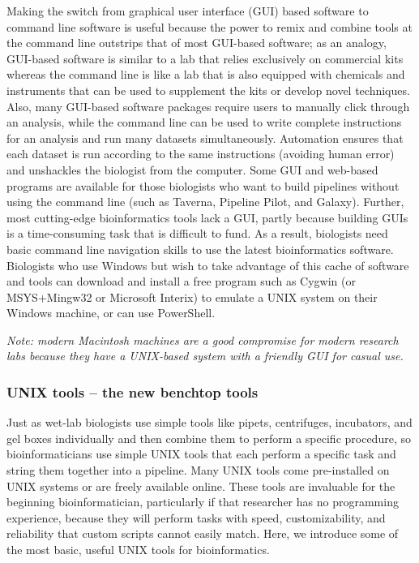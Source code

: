 \documentclass[ChapterTOCs,krantz2]{krantz} %
\newcommand{\unix}{UNIX}
\begin{document}
Making the switch from graphical user interface (GUI) based software 
to command line software is useful because
the power to remix and combine tools at the command line outstrips that
of most GUI-based software; as an analogy, GUI-based software is similar to a lab
that relies exclusively on commercial kits whereas the command line 
is like a lab that is also equipped with chemicals and instruments that can be used 
to supplement the kits or develop novel techniques.  Also, many
GUI-based software packages require users to manually click through an analysis,
while the command line can be used to write complete instructions for an
analysis and run many datasets simultaneously.   Automation ensures 
that each dataset is run according to the
same instructions (avoiding human error) and unshackles the biologist from
the computer.  
Some GUI and web-based programs are available 
for those biologists who want to build pipelines without using 
the command line (such as Taverna, Pipeline Pilot, and Galaxy).  
Further, most
cutting-edge bioinformatics tools lack a GUI,
partly because building GUIs is a time-consuming task that is
difficult to fund.  As a result, biologists need
basic command line navigation skills to use the latest bioinformatics software.  Biologists
who use Windows but wish to take advantage of this cache of software and tools
can download and install a free program such as Cygwin (or MSYS+Mingw32 or 
Microsoft Interix) to emulate a \unix{} system
on their Windows machine, or can use PowerShell.

\textsl{Note: modern Macintosh machines are a
good compromise for modern research labs because they 
have a \unix{}-based system with a friendly GUI for casual use.}

\subsubsection{\unix{} tools -- the new benchtop tools}

Just as wet-lab biologists use simple tools like pipets, centrifuges,
incubators, and gel boxes individually and then combine them to perform a
specific procedure, so bioinformaticians use simple \unix{} tools
that each perform a specific task and string them together into a pipeline.
Many \unix{} tools come pre-installed on \unix{} systems or are freely
available online. These tools are invaluable for the beginning
bioinformatician, particularly if that researcher has no programming experience, 
because they will perform tasks with speed, customizability, and
reliability that custom scripts cannot easily match.  Here, we
introduce some of the most basic, useful \unix{} tools for bioinformatics.
\end{document}

